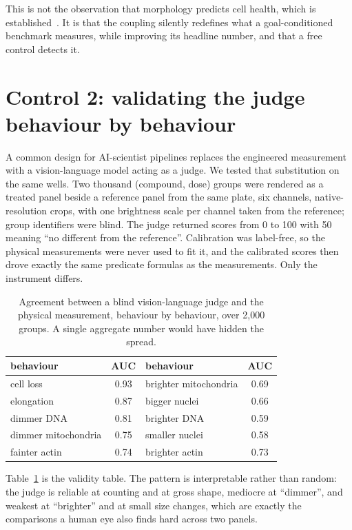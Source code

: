 \documentclass[letterpaper]{article}
\begin{document}
This is not the observation that morphology predicts cell health, which is
established~\citep{way2021cellhealth}. It is that the coupling silently redefines what
a goal-conditioned benchmark measures, while improving its headline number, and that a
free control detects it.

\section{Control 2: validating the judge behaviour by behaviour}

A common design for AI-scientist pipelines replaces the engineered measurement with a
vision-language model acting as a judge. We tested that substitution on the same wells.
Two thousand (compound, dose) groups were rendered as a treated panel beside a
reference panel from the same plate, six channels, native-resolution crops, with one
brightness scale per channel taken from the reference; group identifiers were blind.
The judge returned scores from 0 to 100 with 50 meaning ``no different from the
reference''. Calibration was label-free, so the physical measurements were never used
to fit it, and the calibrated scores then drove exactly the same predicate formulas as
the measurements. Only the instrument differs.

\begin{table}[t]
\centering
\small
\begin{tabular}{lc@{\hskip 1.2em}lc}
\toprule
behaviour & AUC & behaviour & AUC \\
\midrule
cell loss          & 0.93 & brighter mitochondria & 0.69 \\
elongation         & 0.87 & bigger nuclei         & 0.66 \\
dimmer DNA         & 0.81 & brighter DNA          & 0.59 \\
dimmer mitochondria& 0.75 & smaller nuclei        & 0.58 \\
fainter actin      & 0.74 & brighter actin        & 0.73 \\
\bottomrule
\end{tabular}
\caption{Agreement between a blind vision-language judge and the physical measurement,
behaviour by behaviour, over 2{,}000 groups. A single aggregate number would have hidden
the spread.}
\label{tab:judge}
\end{table}

Table~\ref{tab:judge} is the validity table. The pattern is interpretable rather than
random: the judge is reliable at counting and at gross shape, mediocre at ``dimmer'',
and weakest at ``brighter'' and at small size changes, which are exactly the
comparisons a human eye also finds hard across two panels.
\end{document}
